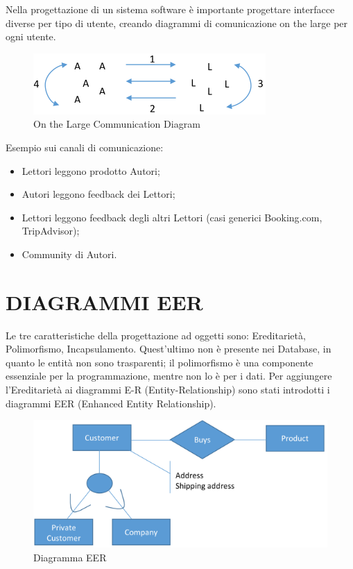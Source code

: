 Nella progettazione di un sistema software è importante progettare interfacce diverse per tipo di utente, creando diagrammi di comunicazione on the large per ogni utente. 

\begin{center}
\begin{figure}[H]
\centering
\includegraphics[scale=1]{figures/otl.png}
\caption{On the Large Communication Diagram}
\end{figure}
\end{center}

Esempio sui canali di comunicazione:

\begin{itemize}

\item Lettori leggono prodotto Autori;
\item Autori leggono feedback dei Lettori;
\item Lettori leggono feedback degli altri Lettori (casi generici Booking.com, TripAdvisor);
\item Community di Autori. 

\end{itemize}

\section{DIAGRAMMI EER}

Le tre caratteristiche della progettazione ad oggetti sono: Ereditarietà, Polimorfismo, Incapsulamento. Quest’ultimo non è presente nei Database, in quanto le entità non sono trasparenti; il polimorfismo è una componente essenziale per la programmazione, mentre non lo è per i dati. Per aggiungere l’Ereditarietà ai diagrammi E-R (Entity-Relationship) sono stati introdotti i diagrammi EER (Enhanced Entity Relationship).

\begin{center}
\begin{figure}[H]
\centering
\includegraphics[scale=1]{figures/EER.png}
\caption{Diagramma EER}
\end{figure}
\end{center}

